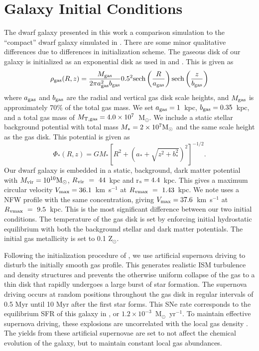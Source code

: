 \documentclass[twocolumn]{aastex61}
\begin{document}
\section{Galaxy Initial Conditions}
\label{sec:IC}
The dwarf galaxy presented in this work a comparison simulation to the ``compact'' dwarf galaxy simulated in \cite{Hu2017}. There are some minor qualitative differences due to differences in initialization scheme. The gaseous disk of our galaxy is initialized as an exponential disk as used in \cite{Tonnesen2009} and \cite{Salem2015}. This is given as
\begin{equation}
\rho_{\rm gas} (R,z) = \frac{M_{\rm gas}}{2\pi a^2_{\rm gas}b_{\rm gas}} 0.5^2{\rm sech}\left(\frac{R}{a_{\rm gas}}\right){\rm sech}\left(\frac{z}{b_{\rm gas}}\right)
\end{equation}
where $a_{\rm gas}$ and $b_{\rm gas}$ are the radial and vertical gas disk scale heights, and $M_{\rm gas}$ is approximately 70\% of the total gas mass. We set $a_{\rm gas} = 1$~kpc, $b_{\rm gas} = 0.35$~kpc, and a total gas mass of $M_{\rm T,gas} = 4.0\times 10^7$~M$_{\odot}$. We include a static \citet{MiyamotoNagai1975} stellar background potential with total mass $M_{*} = 2\times 10^7 \rm{M_{\odot}}$ and the same scale height as the gas disk. This potential is given as
\begin{equation}
\Phi_* (R,z) = GM_{*}\left[R^2 + \left(a_* + \sqrt{z^2 + b_*^2}\right)^2\right]^{-1/2}.
\end{equation}
Our dwarf galaxy is embedded in a static, background, \citet{Burkert1995} dark matter potential with $M_{\rm vir} = 10^{10} \rm{M_{\odot}}$, $R_{\rm vir}~=~44$~kpc and r$_{\rm s} = 4.4$~kpc. This gives a maximum circular velocity $V_{\rm max} = 36.1$~km~s$^{-1}$ at $R_{\rm vmax}~=~1.43$~kpc. We note \cite{Hu2017} uses a NFW profile with the same concentration, giving $V_{\rm max} = 37.6$~km~s$^{-1}$ at $R_{\rm vmax}~=~9.5$~kpc. This is the most significant difference between our two initial conditions. The temperature of the gas disk is set by enforcing initial hydrostatic equilibrium with both the background stellar and dark matter potentials. The initial gas metallicity is set to 0.1 Z$_{\odot}$.

Following the initialization procedure of \cite{Hu2017}, we use artificial supernova driving to disturb the initially smooth gas profile. This generates realistic ISM turbulence and density structures and prevents the otherwise uniform collapse of the gas to a thin disk that rapidly undergoes a large burst of star formation. The supernova driving occurs at random positions throughout the gas disk in regular intervals of 0.5 Myr until 10 Myr after the first star forms. This SNe rate corresponds to the equilibrium SFR of this galaxy in \cite{Hu2017}, or $1.2\times 10^{-3}$~M$_{\odot}$~yr$^{-1}$. To maintain effective supernova driving, these explosions are uncorrelated with the local gas density \citep{Gatto2017}. The yields from these artificial supernovae are set to not affect the chemical evolution of the galaxy, but to maintain constant local gas abundances.
\end{document}
